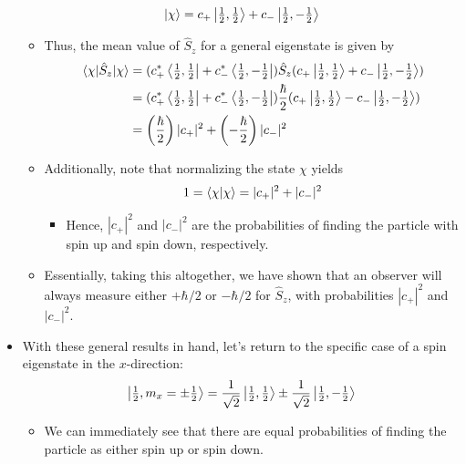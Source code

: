 \documentclass[../notes.tex]{subfiles}
\begin{document}
\begin{itemize}
    \begin{equation*}
        \ket{\chi} = c_+\ket{\tfrac{1}{2},\tfrac{1}{2}}+c_-\ket{\tfrac{1}{2},-\tfrac{1}{2}}
    \end{equation*}
    \begin{itemize}
        \item Thus, the mean value of $\hat{S}_z$ for a general eigenstate is given by
        \begin{align*}
            \ev{\hat{S}_z}{\chi} &= (c_+^*\bra{\tfrac{1}{2},\tfrac{1}{2}}+c_-^*\bra{\tfrac{1}{2},-\tfrac{1}{2}})\hat{S}_z(c_+\ket{\tfrac{1}{2},\tfrac{1}{2}}+c_-\ket{\tfrac{1}{2},-\tfrac{1}{2}})\\
            &= (c_+^*\bra{\tfrac{1}{2},\tfrac{1}{2}}+c_-^*\bra{\tfrac{1}{2},-\tfrac{1}{2}})\frac{\hbar}{2}(c_+\ket{\tfrac{1}{2},\tfrac{1}{2}}-c_-\ket{\tfrac{1}{2},-\tfrac{1}{2}})\\
            &= \left( \frac{\hbar}{2} \right)|c_+|^2+\left( -\frac{\hbar}{2} \right)|c_-|^2
        \end{align*}
        \item Additionally, note that normalizing the state $\chi$ yields
        \begin{equation*}
            1 = \braket{\chi}
            = |c_+|^2+|c_-|^2
        \end{equation*}
        \begin{itemize}
            \item Hence, $|c_+|^2$ and $|c_-|^2$ are the probabilities of finding the particle with spin up and spin down, respectively.
        \end{itemize}
        \item Essentially, taking this altogether, we have shown that an observer will always measure either $+\hbar/2$ or $-\hbar/2$ for $\hat{S}_z$, with probabilities $|c_+|^2$ and $|c_-|^2$.
    \end{itemize}
    \item With these general results in hand, let's return to the specific case of a spin eigenstate in the $x$-direction:
    \begin{equation*}
        \ket{\tfrac{1}{2},m_x=\pm\tfrac{1}{2}} = \frac{1}{\sqrt{2}}\ket{\tfrac{1}{2},\tfrac{1}{2}}\pm\frac{1}{\sqrt{2}}\ket{\tfrac{1}{2},-\tfrac{1}{2}}
    \end{equation*}
    \begin{itemize}
        \item We can immediately see that there are equal probabilities of finding the particle as either spin up or spin down.

\end{itemize}
\end{itemize}
\end{document}
